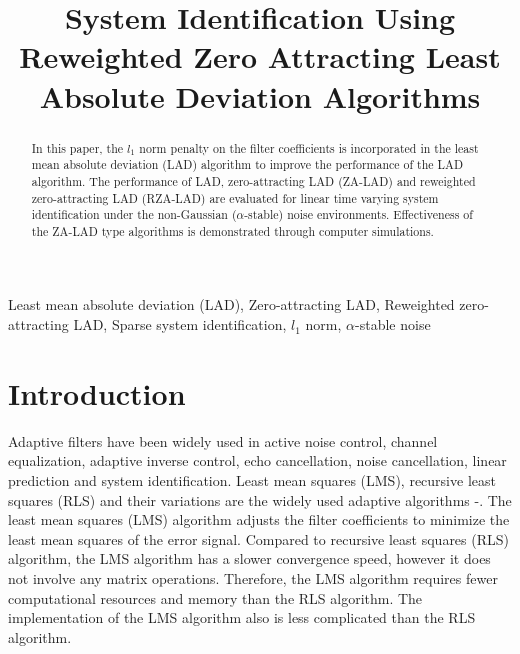 \documentclass[conference]{IEEEtran}
\begin{document}
\title{System Identification Using Reweighted Zero Attracting Least Absolute Deviation Algorithms}


\author{
}










\maketitle


\begin{abstract}
In this paper,  the $l_1$ norm penalty on the filter coefficients is incorporated in the least mean absolute deviation (LAD) algorithm to improve the performance of the LAD algorithm.  The performance of LAD, zero-attracting LAD (ZA-LAD)  and reweighted  zero-attracting LAD (RZA-LAD) are evaluated for linear time varying system identification under the non-Gaussian ($\alpha$-stable)  noise environments. Effectiveness of the ZA-LAD type algorithms is demonstrated through computer simulations.
\end{abstract}

\begin{IEEEkeywords}
Least mean absolute deviation (LAD), Zero-attracting LAD, Reweighted  zero-attracting LAD, Sparse system identification, $l_1$ norm, $\alpha$-stable noise
\end{IEEEkeywords}


\section{Introduction}
\label{S1}
Adaptive  filters have been widely used in active noise control, channel equalization, adaptive inverse control, echo cancellation, noise cancellation, linear prediction and system identification.  Least mean squares (LMS), recursive least squares (RLS) and their variations are the widely used  adaptive algorithms \cite{ref1b}-\cite{ref4b}. The least mean squares (LMS) algorithm adjusts the filter coefficients to minimize the least mean squares of the error signal. Compared to recursive least squares (RLS) algorithm, the LMS algorithm has a slower convergence speed, however it does not involve any matrix operations. Therefore, the LMS algorithm requires fewer computational resources and memory than the RLS algorithm. The implementation of the LMS algorithm also is less complicated than the RLS algorithm. 
\end{document}
